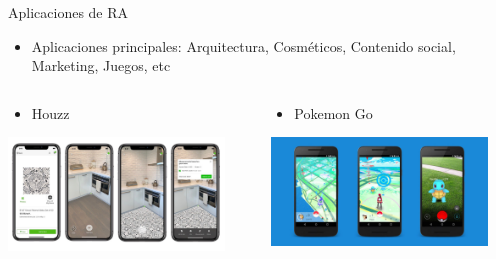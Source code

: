 \begin{frame}{Aplicaciones de RA}
\begin{itemize}
\item Aplicaciones principales: Arquitectura, Cosméticos, Contenido social, Marketing, Juegos, etc
\end{itemize}

\begin{columns}
\begin{column}{0.49\textwidth}
\begin{itemize}
\item Houzz
\end{itemize}
\begin{center}
\includegraphics[width=0.9\textwidth]{Figs/AR_App}\\
\end{center}
\end{column}
\begin{column}{0.49\textwidth}  

\begin{itemize}
\item Pokemon Go
\end{itemize}
    \begin{center}
     \includegraphics[width=0.9\textwidth]{Figs/Pokemon}
     \end{center}
\end{column}
\end{columns}
\end{frame}


